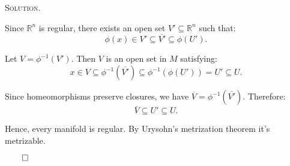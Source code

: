 \documentclass[12pt, a4paper, oneside]{ctexart}
\newenvironment{solution}{%
	\par\noindent\textsc{Solution. }\ignorespaces
}{%
	\hfill$\qed$\par
}
\begin{document}
\begin{solution}
    Since \( \mathbb{R}^n \) is regular, there exists an open set \( V' \subseteq \mathbb{R}^n \) such that:
    \[
    \phi(x) \in V' \subseteq \overline{V'} \subseteq \phi(U').
    \]


    Let \( V = \phi^{-1}(V') \). Then \( V \) is an open set in \( M \) satisfying:
    \[
    x \in V \subseteq \phi^{-1}(\overline{V'}) \subseteq \phi^{-1}(\phi(U')) = U' \subseteq U.
    \]


    Since homeomorphisms preserve closures, we have \( \overline{V} = \phi^{-1}(\overline{V'}) \). Therefore:
    \[
    \overline{V} \subseteq U' \subseteq U.
    \]


	Hence, every manifold is regular. By Urysohn's metrization theorem it's metrizable.

	\end{solution}
\end{document}

